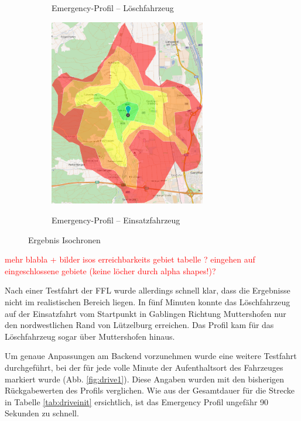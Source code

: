 \documentclass[12pt,a4paper]{article}
\newcommand\todo[1]{\textcolor{red}{#1}}
\begin{document}
\begin{figure}[h]
\begin{subfigure}{0.49\textwidth}
\caption{Emergency-Profil -- Löschfahrzeug}
\label{fig:isofire}
\end{subfigure}
\begin{subfigure}{0.49\textwidth}
\centering
\includegraphics[width = 0.75\textwidth]{../media/isoeme.png} \\
\caption{Emergency-Profil -- Einsatzfahrzeug}
\label{fig:isoeme}
\end{subfigure}
\caption{Ergebnis Isochronen}
\label{fig:isochrones}
\end{figure}

\todo{
mehr blabla
+ bilder isos 
erreichbarkeits gebiet tabelle ?
eingehen auf eingeschlossene gebiete (keine löcher durch alpha shapes!)?
}

Nach einer Testfahrt der FFL wurde allerdings schnell klar, dass die Ergebnisse nicht im realistischen Bereich liegen. In fünf Minuten konnte das Löschfahrzeug auf der Einsatzfahrt vom Startpunkt in Gablingen Richtung Muttershofen nur den nordwestlichen Rand von Lützelburg erreichen. Das Profil kam für das Löschfahrzeug sogar über Muttershofen hinaus.



Um genaue Anpassungen am Backend vorzunehmen wurde eine weitere Testfahrt durchgeführt, bei der für jede volle Minute der Aufenthaltsort des Fahrzeuges markiert wurde (Abb. \ref{fig:drive1}).
Diese Angaben wurden mit den bisherigen Rückgabewerten des Profils verglichen.
Wie aus der Gesamtdauer für die Strecke in Tabelle \ref{tab:driveinit} ersichtlich, ist das Emergency Profil ungefähr 90 Sekunden zu schnell.
\end{document}
